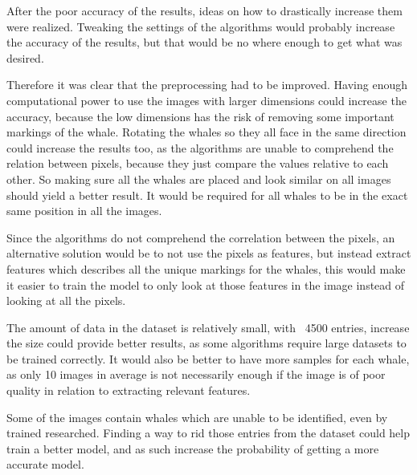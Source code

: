 After the poor accuracy of the results, ideas on how to drastically increase them were realized. Tweaking the settings of the algorithms would probably increase the accuracy of the results, but that would be no where enough to get what was desired. 

Therefore it was clear that the preprocessing had to be improved. Having enough computational power to use the images with larger dimensions could increase the accuracy, because the low dimensions has the risk of removing some important markings of the whale. Rotating the whales so they all face in the same direction could increase the results too, as the algorithms are unable to comprehend the relation between pixels, because they just compare the values relative to each other. So making sure all the whales are placed and look similar on all images should yield a better result. It would be required for all whales to be in the exact same position in all the images.

Since the algorithms do not comprehend the correlation between the pixels, an alternative solution would be to not use the pixels as features, but instead extract features which describes all the unique markings for the whales, this would make it easier to train the model to only look at those features in the image instead of looking at all the pixels.

The amount of data in the dataset is relatively small, with ~4500 entries, increase the size could provide better results, as some algorithms require large datasets to be trained correctly. It would also be better to have more samples for each whale, as only 10 images in average is not necessarily enough if the image is of poor quality in relation to extracting relevant features.

Some of the images contain whales which are unable to be identified, even by trained researched. Finding a way to rid those entries from the dataset could help train a better model, and as such increase the probability of getting a more accurate model.
